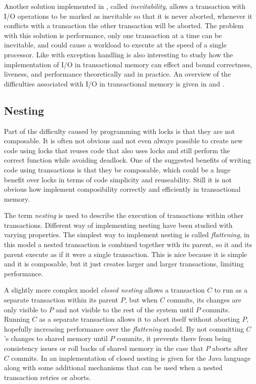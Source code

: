 Another solution implemented in \cite{1504199}, called \emph{inevitability}, allows a transaction with I/O operations to be marked as inevitable so that it is never aborted, whenever it conflicts with a transaction the other transaction will be aborted.
The problem with this solution is performance, only one transaction at a time can be inevitable, and could cause a workload to execute at the speed of a single processor.
Like with exception handling is also interesting to study how the implementation of I/O in transactional memory can effect and bound correctness, liveness, and performance theoretically and in practice.
An overview of the difficulties associated with I/O in transactional memory is given in \cite{1364800} and \cite{10.1109/MM.2007.63}.

\subsection{Nesting}
Part of the difficulty caused by programming with locks is that they are not composable.
It is often not obvious and not even always possible to create new code using locks that reuses code that also uses locks and still perform the correct function while avoiding deadlock.
One of the suggested benefits of writing code using transactions is that they be composable, which could be a huge benefit over locks in terms of code simplicity and reuseability.
Still it is not obvious how implement composibility correctly and efficiently in transactional memory.

The term \emph{nesting} is used to describe the execution of transactions within other transactions.
Different way of implementing nesting have been studied with varying properties.
The simplest way to implement nesting is called \emph{flattening}, in this model a nested transaction is combined together with its parent, so it and its parent execute as if it were a single transaction.
This is nice because it is simple and it is composable, but it just creates larger and larger transactions, limiting performance.

A slightly more complex model \emph{closed nesting} allows a transaction $C$ to run as a separate transaction within its parent $P$, but when $C$ commits, its changes are only visible to $P$ and not visible to the rest of the system until $P$ commits.
Running $C$ as a separate transaction allows it to abort itself without aborting $P$, hopefully increasing performance over the \emph{flattening} model.
By not committing $C$'s changes to shared memory until $P$ commits, it prevents there from being consistency issues or roll backs of shared memory in the case that $P$ aborts after $C$ commits.
In \cite{1133985} an implementation of closed nesting is given for the Java language along with some additional mechanisms that can be used when a nested transaction retries or aborts.

